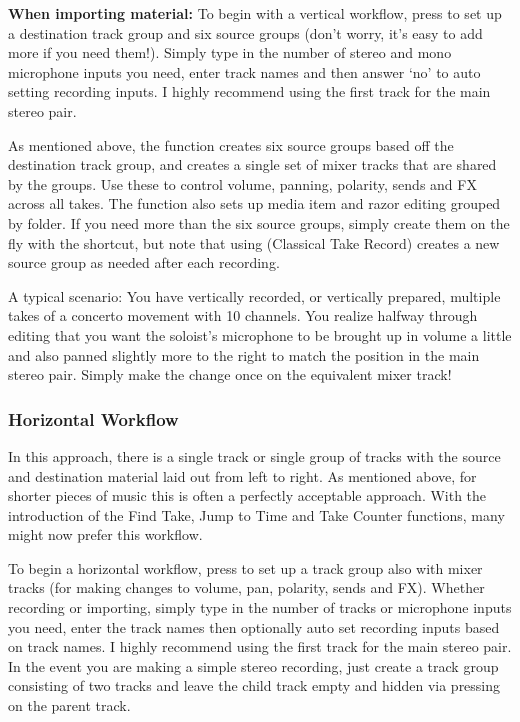 \documentclass[10pt,american]{article}
\begin{document}
\textbf{When importing material:} To begin with a vertical workflow, press
 to set up a destination track group and six source groups (don't
worry, it's easy to add more if you need them!). Simply type in the number of
stereo and mono microphone inputs you need, enter track names and then answer
`no' to auto setting recording inputs. I highly recommend using the first track
for the main stereo pair. 

As mentioned above, the  function creates six source groups based off
the destination track group, and creates a single set of mixer tracks that are
shared by the groups. Use these to control volume, panning, polarity, sends and
FX across all takes. The function also sets up media item and razor editing
grouped by folder. If you need more than the six source groups, simply create
them on the fly with the \keys{\textbackslash} shortcut, but note that using
 (Classical Take Record) creates a new source group as needed after
each recording.

A typical scenario: You have vertically recorded, or vertically prepared,
multiple takes of a concerto movement with 10 channels. You realize halfway
through editing that you want the soloist's microphone to be brought up in
volume a little and also panned slightly more to the right to match the position
in the main stereo pair. Simply make the change once on the equivalent mixer
track!

\subsubsection{Horizontal Workflow}

In this approach, there is a single track or single group of tracks with the
source and destination material laid out from left to right. As mentioned above,
for shorter pieces of music this is often a perfectly acceptable approach. With
the introduction of the Find Take, Jump to Time and Take Counter functions, many
might now prefer this workflow.

To begin a horizontal workflow, press  to set up a track group also
with mixer tracks (for making changes to volume, pan, polarity, sends and FX).
Whether recording or importing, simply type in the number of tracks or
microphone inputs you need, enter the track names then optionally auto set
recording inputs based on track names. I highly recommend using the first track
for the main stereo pair. In the event you are making a simple stereo recording,
just create a track group consisting of two tracks and leave the child track
empty and hidden via pressing  on the parent track.
\end{document}
